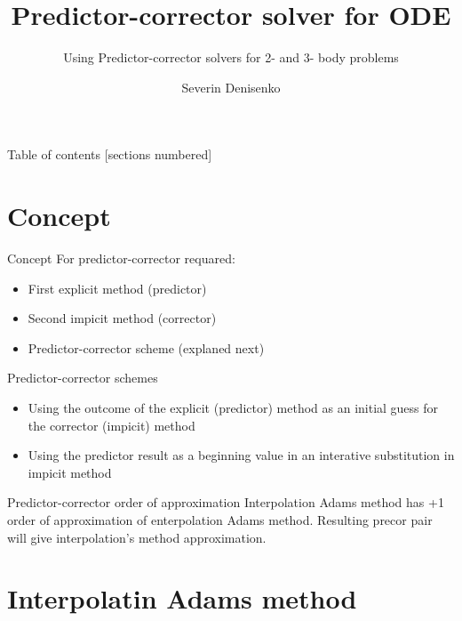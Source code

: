 \documentclass[10pt]{beamer}
\title{Predictor-corrector solver for ODE}
\subtitle{Using Predictor-corrector solvers for 2- and 3- body problems}
\date{}
\author{Severin Denisenko}
\institute{Saint Petersburg State University}
\begin{document}
\maketitle

\begin{frame}{Table of contents}
  [sections numbered]
  \tableofcontents%
\end{frame}

\section[Concept]{Concept}

\begin{frame}{Concept}
    For predictor-corrector requared:
	\begin{itemize}
		\item First explicit method (predictor)
		\item Second impicit method (corrector)
		\item Predictor-corrector scheme (explaned next)
	\end{itemize}
\end{frame}

\begin{frame}{Predictor-corrector schemes}
\begin{itemize}
  \item Using the outcome of the explicit (predictor) method as an initial guess for the corrector (impicit) method
  \item Using the predictor result as a beginning value in an interative substitution in impicit method
\end{itemize}
\end{frame}

\begin{frame}{Predictor-corrector order of approximation}
    Interpolation Adams method has +1 order of approximation of enterpolation Adams method. Resulting precor pair will give interpolation's method approximation.
\end{frame}

\section{Interpolatin Adams method}
\end{document}
